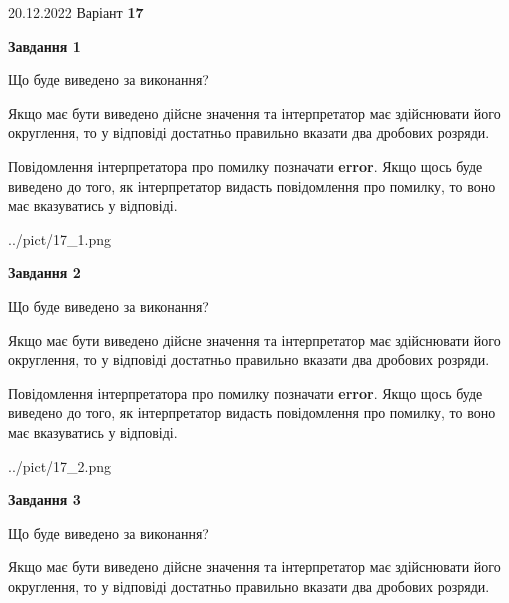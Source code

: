 \documentclass[12pt, ukrainian]{article}
\begin{document}
{20.12.2022 Варіант \No \textbf { 17 }\par}
{
\begin {Large}

{\begin {center}\textbf{Завдання 1}\end {center}}\par
Що буде виведено за виконання? \par

Якщо має бути виведено дійсне значення та інтерпретатор має здійснювати його округлення, 
то у відповіді достатньо правильно вказати два дробових розряди.

Повідомлення інтерпретатора про помилку позначати \textbf{error}.
Якщо щось буде виведено до того, як інтерпретатор видасть повідомлення про помилку, 
то воно має вказуватись у відповіді. \par

\begin{center}
	{../pict/17_1.png}
\end{center}
\newpage

{\begin {center}\textbf{Завдання 2}\end {center}}\par
Що буде виведено за виконання? \par

Якщо має бути виведено дійсне значення та інтерпретатор має здійснювати його округлення, 
то у відповіді достатньо правильно вказати два дробових розряди.

Повідомлення інтерпретатора про помилку позначати \textbf{error}.
Якщо щось буде виведено до того, як інтерпретатор видасть повідомлення про помилку, 
то воно має вказуватись у відповіді. \par

\begin{center}
	{../pict/17_2.png}
\end{center}
\newpage

{\begin {center}\textbf{Завдання 3}\end {center}}\par
Що буде виведено за виконання? \par

Якщо має бути виведено дійсне значення та інтерпретатор має здійснювати його округлення, 
то у відповіді достатньо правильно вказати два дробових розряди.


\end{Large}}
\end{document}
